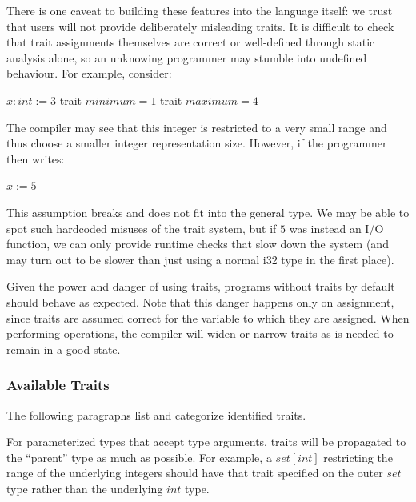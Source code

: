 There is one caveat to building these features into the language itself: we trust that users will not provide deliberately misleading traits. It is difficult to check that trait assignments themselves are correct or well-defined through static analysis alone, so an unknowing programmer may stumble into undefined behaviour. For example, consider:
\begin{algorithmic}
  \State $x: int := 3$
  \State \quad trait $minimum = 1$
  \State \quad trait $maximum = 4$
\end{algorithmic}
The compiler may see that this integer is restricted to a very small range and thus choose a smaller integer representation size. However, if the programmer then writes:
\begin{algorithmic}
  \State $x := 5$
\end{algorithmic}
This assumption breaks and does not fit into the general type. We may be able to spot such hardcoded misuses of the trait system, but if $5$ was instead an I/O function, we can only provide runtime checks that slow down the system (and may turn out to be slower than just using a normal i32 type in the first place).

Given the power and danger of using traits, programs without traits by default should behave as expected. Note that this danger happens only on assignment, since traits are assumed correct for the variable to which they are assigned. When performing operations, the compiler will widen or narrow traits as is needed to remain in a good state.

\subsubsection{Available Traits}
The following paragraphs list and categorize identified traits.

For parameterized types that accept type arguments, traits will be propagated to the ``parent'' type as much as possible. For example, a $set[int]$ restricting the range of the underlying integers should have that trait specified on the outer $set$ type rather than the underlying $int$ type.

